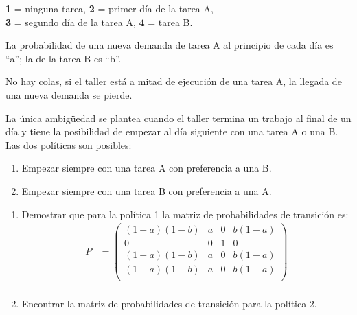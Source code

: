 \documentclass{templateNote}
\begin{document}
\begin{enumerate}
    \begin{center}
        \textbf{1} = ninguna tarea, \textbf{2} = primer día de la tarea A, \\\textbf{3} = segundo día de la tarea A, \textbf{4} = tarea B.
    \end{center}

    La probabilidad de una nueva demanda de tarea A al principio de cada día es “a”; la de la tarea B es “b”. 

    No hay colas, si el taller está a mitad de ejecución de una tarea A, la llegada de una nueva demanda se pierde. 

    La única ambigüedad se plantea cuando el taller termina un trabajo al final de un día y tiene la posibilidad de empezar al día siguiente con una tarea A o una B. Las dos políticas son posibles:

    \begin{enumerate}[label = \arabic*)]
        \item Empezar siempre con una tarea A con preferencia a una B.
        \item Empezar siempre con una tarea B con preferencia a una A.
    \end{enumerate}

    \begin{enumerate}[label = \alph*)]
        \item Demostrar que para la política 1 la matriz de probabilidades de transición es:
        \begin{align*}
            P &= \left(
                \begin{array}{cccc}    
                    (1-a)(1-b)  & a & 0 & b(1-a)\\
                    0           & 0 & 1 & 0     \\
                    (1-a)(1-b)  & a & 0 & b(1-a)\\
                    (1-a)(1-b)  & a & 0 & b(1-a)\\
                \end{array}
                \right)\\
        \end{align*}
        \item Encontrar la matriz de probabilidades de transición para la política 2.
    \end{enumerate}


\end{enumerate}
\end{document}
